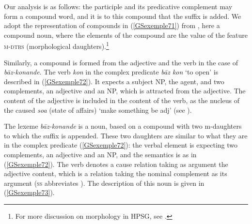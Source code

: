 Our analysis is as follows: the participle and its predicative complement may form a compound word, and it is to this compound that the suffix  is added. We adopt the representation of compounds in (\ref{GSexemple71}) from \citep[178]{bonami2018lexeme}, here a compound noun, where the elements of the compound are the value of the feature \textsc{m-dtrs} (morphological daughters).\footnote{For more discussion on morphology in HPSG, see .}

\ea
\label{GSexemple71}%
\z

Similarly, a compound is formed from the adjective and the verb in the case of \emph{b\=az-konande}. The verb \emph{kon} in the complex predicate \emph{b\=az kon} `to open' is described in (\ref{GSexemple72}). It expects a subject NP, the agent, and two complements, an adjective and an NP, which is attracted from the adjective. The content of the adjective is included in the content of the verb, as the nucleus of the caused \emph{soa} (state of affairs) `make something be adj' (see \citealt[642]{MuellerPersian}).

\ea
\label{GSexemple72}
\z
%
The lexeme \emph{b\=az-konande} is a noun, based on a compound with two m-daughters to which the suffix  is appended.
These two daughters are similar to what they are in the complex predicate (\ref{GSexemple72}): the verbal element is expecting two complements, an adjective and an NP, and the semantics is as in (\ref{GSexemple72}). The verb denotes a cause relation taking as argument the adjective content, which is a relation taking the nominal complement as its argument (\textsc{ss} abbreviates \synsem). The description of this noun is given in (\ref{GSexemple73}).

